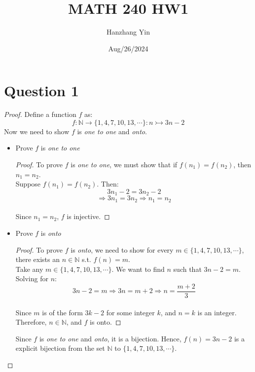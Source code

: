 \documentclass{article}
\title{MATH 240 HW1}
\author{Hanzhang Yin}
\date{Aug/26/2024}
\begin{document}
\maketitle

\section*{Question 1}
\begin{proof}
    Define a function $f$ as:
    \[ f: \mathbb{N} \rightarrow \{1,4,7,10,13,\cdots\}: n \rightarrowtail 3n-2 \]
    Now we need to show $f$ is \textit{one to one} and \textit{onto}.
    \begin{itemize}
        \item Prove $f$ is \textit{one to one}
        \begin{proof}
            To prove $f$ is \textit{one to one}, we must show that if $f(n_1) = f(n_2)$, then $n_1 = n_2$.
            \\
            Suppose $f(n_1) = f(n_2)$. Then:
            \[ 3n_1 - 2 = 3n_2 - 2 \]
            \[ \Rightarrow 3n_1 = 3n_2 \Rightarrow n_1 = n_2\]
            \\
            Since $n_1 = n_2$, $f$ is injective.
        \end{proof}
        \item Prove $f$ is \textit{onto}
        \begin{proof}
            To prove $f$ is \textit{onto}, we need to show for every $m \in \{1,4,7,10,13,\cdots\}$, there exists an $n \in \mathbb{N}$ s.t. $f(n) = m$.
            \\
            Take any $m \in \{1,4,7,10,13,\cdots\}$. We want to find $n$ such that $3n-2 = m$. Solving for $n$:
            \[ 3n-2 = m \Rightarrow 3n = m + 2 \Rightarrow n = \frac{m+2}{3} \]
            \\
            Since $m$ is of the form $3k-2$ for some integer $k$, and $n=k$ is an integer. Therefore, $n \in \mathbb{N}$, and $f$ is onto.
        \end{proof}
        Since $f$ is \textit{one to one} and \textit{onto}, it is a bijection. Hence, $f(n) = 3n - 2$ is a explicit bijection from the set $\mathbb{N}$ to $\{1,4,7,10,13,\cdots\}$.
    \end{itemize}
\end{proof}
\end{document}
